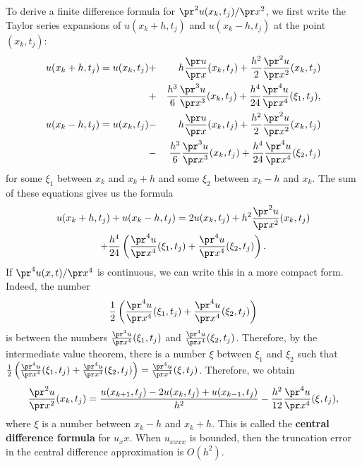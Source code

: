 To derive a finite difference formula for $\pr^2 u(x_k,t_j)/\pr x^2$, we first write the Taylor series expansions
of $u(x_k+h,t_j)$ and $u(x_k-h,t_j)$ at the point $(x_k,t_j)$:
\begin{eqnarray*}
u(x_k+h,t_j)=u(x_k,t_j)&+&h \frac{\pr u}{\pr x}(x_k,t_j)+
\frac{h^2}{2}\frac{\pr^2 u}{\pr x^2}(x_k,t_j)\\
&+&\frac{h^3}{6}\frac{\pr^3 u}{\pr x^3}(x_k,t_{j})+
\frac{h^4}{24}\frac{\pr^4 u}{\pr x^4}(\xi_1,t_{j}), \\
u(x_k-h,t_j)=u(x_k,t_j)&-&h \frac{\pr u}{\pr x}(x_k,t_j)+
\frac{h^2}{2}\frac{\pr^2 u}{\pr x^2}(x_k,t_j)\\
&-&\frac{h^3}{6}\frac{\pr^3 u}{\pr x^3}(x_k,t_{j})+
\frac{h^4}{24}\frac{\pr^4 u}{\pr x^4}(\xi_2,t_{j}) 
\end{eqnarray*}
for some $\xi_{1}$ between $x_{k}$ and $x_{k}+h$
and some $\xi_{2}$ between $x_{k}-h$ and $x_{k}$. 
The sum of these equations gives us the formula
\begin{multline}
u(x_k+h,t_j)+u(x_k-h,t_j)=2u(x_k,t_j)+ h^2\frac{\pr^2 u}{\pr
x^2}(x_k,t_j)\\
+ \frac{h^4}{24}\left(\frac{\pr^4 u}{\pr
x^4}(\xi_1,t_{j}) +\frac{\pr^4 u}{\pr x^4}(\xi_2,t_{j})\right).
\end{multline}
If $\pr^4 u(x,t)/\pr x^4$ is continuous, we can write this in a more compact form. Indeed, the number
\[
\frac{1}{2}\left(\frac{\pr^4 u}{\pr x^4}(\xi_{1}, t_{j})+\frac{\pr^4 u}{\pr x^4}(\xi_{2},t_{j})\right)
\]
is between
the numbers $\frac{\pr^4 u}{\pr x^4}(\xi_{1},t_{j})$ and $\frac{\pr^4 u}{\pr x^4}(\xi_{2},t_{j})$. Therefore,
by the intermediate value theorem, there is a number $\xi$ between $\xi_{1}$ and $\xi_{2}$ such that
$\frac{1}{2}\left(\frac{\pr^4 u}{\pr x^4}(\xi_{1},t_{j})+\frac{\pr^4 u}{\pr x^4}(\xi_{2},t_{j})\right)
=\frac{\pr^4 u}{\pr x^4}(\xi,t_{j})$. Therefore, we obtain
\begin{equation}
\frac{\pr^2 u}{\pr x^2}(x_k,t_j)=\frac{u(x_{k+1},t_j)-2u(x_k,t_j)+u(x_{k-1},t_j)}{h^2}
-\frac{h^2}{12}\frac{\pr^4 u}{\pr x^4}(\xi,t_{j}), \label{a17}
\end{equation}
where $\xi$ is a number between $x_{k}-h$ and $x_{k}+h$.
This is called the {\bf central difference formula} for $u_xx$. When $u_{xxxx}$ is bounded,
then the truncation error in the central difference approximation is $O(h^2)$.
  

